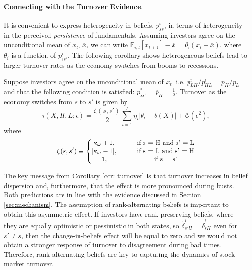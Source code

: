 \paragraph{Connecting with the Turnover Evidence.}
It is convenient to express heterogeneity in beliefs, $p_{ss}^i$, in terms of heterogeneity in the perceived \textit{persistence} of fundamentals. Assuming investors agree on the unconditional mean of $x_t$, $\overline{x}$, we can write $\mathbb{E}_{i,t}[x_{t+1}] - \overline{x} = \theta_i (x_t - \overline{x})$, where $\theta_i$ is a function of $p_{ss'}^i$.
The following corollary shows heterogeneous beliefs lead to larger turnover rates as the economy switches from booms to recessions.
\begin{corollary}\label{cor: turnover} Suppose investors agree on the unconditional mean of $x_t$, i.e. $p_{LH}^i / p_{HL}^i = \overline{p}_H / \overline{p}_L$ and that the following condition is satisfied: $p_{ss'}^* = \overline{p}_H = \frac{1}{2}$. Turnover as the economy switches from $s$ to $s'$ is given by
\begin{equation}
    \tau(X,H,L;\epsilon) = \frac{\zeta(s,s')}{2}\sum_{i=1}^I \eta_i |\theta_i - \theta(X)| + \mathcal{O}(\epsilon^2),
\end{equation}
where
\begin{equation*}
    \zeta(s,s') \equiv \left\{ 
    \begin{matrix}
    \kappa_\omega + 1, \qquad & \text{if } $s = H$ \text{ and } $s' = L$\\
    |\kappa_\omega - 1|, \qquad & \text{if } $s = L$ \text{ and } $s'  = H$\\
    1, \qquad & \text{if } $s = s'$
    \end{matrix}
    \right. 
\end{equation*}
\end{corollary}
 The key message from Corollary \ref{cor: turnover} is that turnover increases in belief dispersion and, furthermore, that the effect is more pronounced during busts. 
Both predictions are in line with the evidence discussed in Section \ref{sec:mechanism}. The assumption of rank-alternating beliefs is important to obtain this asymmetric effect. 
If investors have rank-preserving beliefs, where they are equally optimistic or pessimistic in both states, so $\tilde{\delta}_{s'H}^i = \tilde{\delta}_{sH}^i $ even for $s'\neq s$, then the change-in-beliefs effect will be equal to zero and we would not obtain a stronger response of turnover to disagreement during bad times. Therefore, rank-alternating beliefs are key to capturing the dynamics of stock market turnover. 

